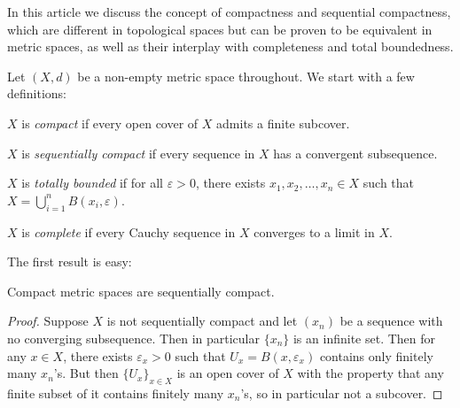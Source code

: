 \documentclass[a4paper]{article}
\begin{document}
\maketitle

In this article we discuss the concept of compactness and sequential compactness, which are different in topological spaces but can be proven to be equivalent in metric spaces, as well as their interplay with completeness and total boundedness.

Let \((X, d)\) be a non-empty metric space throughout. We start with a few definitions:

\begin{definition}[Compactness]
  \(X\) is \emph{compact} if every open cover of \(X\) admits a finite subcover.
\end{definition}

\begin{definition}
  \(X\) is \emph{sequentially compact} if every sequence in \(X\) has a convergent subsequence.
\end{definition}

\begin{definition}
  \(X\) is \emph{totally bounded} if for all \(\varepsilon > 0\), there exists \(x_1, x_2, \dots, x_n \in X\) such that \(X = \bigcup_{i = 1}^n B(x_i, \varepsilon)\).
\end{definition}

\begin{definition}[Completeness]
  \(X\) is \emph{complete} if every Cauchy sequence in \(X\) converges to a limit in \(X\).
\end{definition}

The first result is easy:

\begin{proposition}
  Compact metric spaces are sequentially compact.
\end{proposition}

\begin{proof}
  Suppose \(X\) is not sequentially compact and let \((x_n)\) be a sequence with no converging subsequence. Then in particular \(\{x_n\}\) is an infinite set. Then for any \(x \in X\), there exists \(\varepsilon_x > 0\) such that \(U_x = B(x, \varepsilon_x)\) contains only finitely many \(x_n\)'s. But then \(\{U_x\}_{x \in X}\) is an open cover of \(X\) with the property that any finite subset of it contains finitely many \(x_n\)'s, so in particular not a subcover.
\end{proof}
\end{document}
